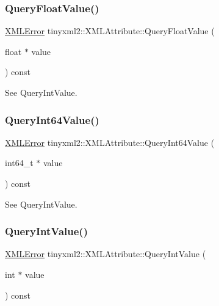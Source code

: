 \subsubsection{\texorpdfstring{Query\+Float\+Value()}{QueryFloatValue()}}
{\footnotesize\ttfamily \hyperlink{namespacetinyxml2_a1fbf88509c3ac88c09117b1947414e08}{X\+M\+L\+Error} tinyxml2\+::\+X\+M\+L\+Attribute\+::\+Query\+Float\+Value (\begin{DoxyParamCaption}\item[{float $\ast$}]{value }\end{DoxyParamCaption}) const}



See Query\+Int\+Value. 

\mbox{\label{classtinyxml2_1_1_x_m_l_attribute_a4e25344d6e4159026be34dbddf1dcac2}} 
\subsubsection{\texorpdfstring{Query\+Int64\+Value()}{QueryInt64Value()}}
{\footnotesize\ttfamily \hyperlink{namespacetinyxml2_a1fbf88509c3ac88c09117b1947414e08}{X\+M\+L\+Error} tinyxml2\+::\+X\+M\+L\+Attribute\+::\+Query\+Int64\+Value (\begin{DoxyParamCaption}\item[{int64\+\_\+t $\ast$}]{value }\end{DoxyParamCaption}) const}



See Query\+Int\+Value. 

\mbox{\label{classtinyxml2_1_1_x_m_l_attribute_a6d5176260db00ea301c01af8457cd993}} 
\subsubsection{\texorpdfstring{Query\+Int\+Value()}{QueryIntValue()}}
{\footnotesize\ttfamily \hyperlink{namespacetinyxml2_a1fbf88509c3ac88c09117b1947414e08}{X\+M\+L\+Error} tinyxml2\+::\+X\+M\+L\+Attribute\+::\+Query\+Int\+Value (\begin{DoxyParamCaption}\item[{int $\ast$}]{value }\end{DoxyParamCaption}) const}

